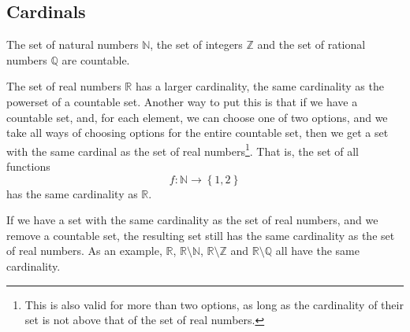 \documentclass[a4paper
,draft
]{article}
\def\reale{\mathbb{R}}
\def\intregi{\mathbb{Z}}
\def\naturale{\mathbb{N}}
\def\rationale{\mathbb{Q}}
\newcommand{\multime}[1]{\left\{ #1 \right\}}
\begin{document}
\subsection{Cardinals}
\label{sec:cardinals}

The set of natural numbers $\naturale$, the set of integers $\intregi$ and
the set of rational numbers $\rationale$ are countable.

The set of real numbers $\reale$ has a larger cardinality, the same cardinality
as the powerset of a countable set. Another way to put this is that
if we have a countable set, and, for each element, we can choose one of two
options,
and we take all ways of choosing options for the entire countable set,
then we get a set with the same cardinal as the set of real numbers\footnote{
    This is also valid for more than two options, as long as the cardinality
    of their set is not above that of the set of real numbers.
  }.
That is, the set of all functions
$$
f : \naturale \longrightarrow \multime{1, 2}
$$
has the same cardinality as $\reale$.

If we have a set with the same cardinality as the set of real numbers, and
we remove a countable set, the resulting set still has the same cardinality
as the set of real numbers. As an example, $\reale$, $\reale\setminus\naturale$,
$\reale\setminus\intregi$ and $\reale\setminus\rationale$ all have the same
cardinality.

\printbibliography
\end{document}
